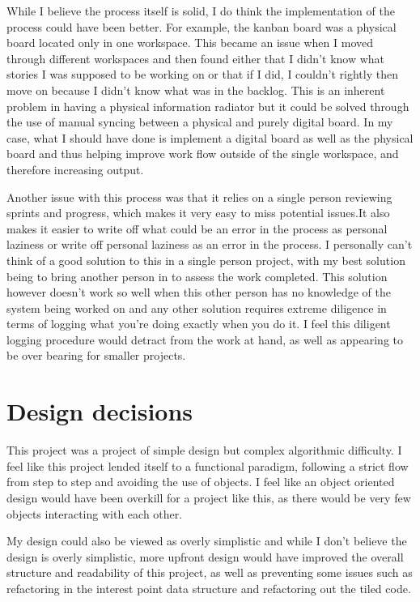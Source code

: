While I believe the process itself is solid, I do think the implementation of the process could have been better. For example, the kanban board was a physical board located only in one workspace. This became an issue when I moved through different workspaces and then found either that I didn't know what stories I was supposed to be working on or that if I did, I couldn't rightly then move on because I didn't know what was in the backlog. This is an inherent problem in having a physical information radiator but it could be solved through the use of manual syncing between a physical and purely digital board. In my case, what I should have done is implement a digital board as well as the physical board and thus helping improve work flow outside of the single workspace, and therefore increasing output.

Another issue with this process was that it relies on a single person reviewing sprints and progress, which makes it very easy to miss potential issues.It also makes it easier to write off what could be an error in the process as personal laziness or write off personal laziness as an error in the process. I personally can't think of a good solution to this in a single person project, with my best solution being to bring another person in to assess the work completed. This solution however doesn't work so well when this other person has no knowledge of the system being worked on and any other solution requires extreme diligence in terms of logging what you're doing exactly when you do it. I feel this diligent logging procedure would detract from the work at hand, as well as appearing to be over bearing for smaller projects.

\section{Design decisions}
This project was a project of simple design but complex algorithmic difficulty. I feel like this project lended itself to a functional paradigm, following a strict flow from step to step and avoiding the use of objects. I feel like an object oriented design would have been overkill for a project like this, as there would be very few objects interacting with each other. 

My design could also be viewed as overly simplistic and while I don't believe the design is overly simplistic, more upfront design would have improved the overall structure and readability of this project, as well as preventing some issues such as refactoring in the interest point data structure and refactoring out the tiled code.


